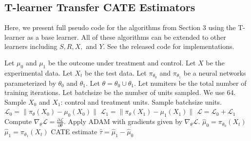 \FloatBarrier

\clearpage
\subsection{T-learner Transfer CATE Estimators}
Here, we present full pseudo code for the algorithms from Section 3 using the T-learner as a base learner. All of these algorithms can be extended to other learners including $S, R, X,$ and $Y$. See the released code for implementations. 

\begin{algorithm}[H]
	\caption{Vanilla T-learner (also referred to as Baseline T-learner)}
	\label{alg:vanilla-t}
	\begin{algorithmic}[1]
		\State Let $\mu_0$ and $\mu_1$ be the outcome under treatment and control. 
		\State Let $X$ be the experimental data. Let $X_t$ be the test data. 
		\State Let $\pi_{\theta_0}$ and $\pi_{\theta_1}$ be a neural networks parameterized by $\theta_0$ and $\theta_1$. 
		\State Let $\theta = \theta_0 \cup \theta_1$. 
		\State Let numiters be the total number of training iterations.
		\State Let batchsize be the number of units sampled. We use 64. 
		\State Sample $X_0$ and $X_1$: control and treatment units. Sample batchsize units.  
		\State $\mathcal{L}_0= \| \pi_\theta (X_0) - \mu_0(X_0) \| $
		\State $\mathcal{L}_1 = \| \pi_\theta (X_1) - \mu_1(X_1) \| $
		\State $\mathcal{L} = \mathcal{L}_0 + \mathcal{L}_1$
		\State Compute $\nabla_{\theta} \mathcal{L} = \frac{\partial \mathcal{L}}{\partial \theta}$.
		\State Apply ADAM with gradients given by $\nabla_{\theta} \mathcal{L}$. 
		\EndFor
		\State $\hat{\mu}_0 = \pi_{\theta_0} (X_t)$
		\State $\hat{\mu}_1 = \pi_{\theta_1} (X_t)$
		 CATE estimate $\hat{\tau} = \hat{\mu}_1 - \hat{\mu}_0$
	\end{algorithmic}
\end{algorithm}


